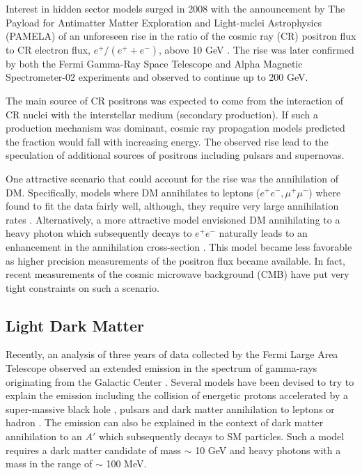 Interest in hidden sector models surged in 2008 with the announcement by 
The Payload for Antimatter Matter Exploration and Light-nuclei Astrophysics \\ 
(PAMELA) of an unforeseen rise in the ratio of the cosmic ray (CR) positron flux
to CR electron flux, $e^{+}/(e^{+} + e^{-})$, above 10 GeV \cite{pamela2008}.
The rise was later confirmed by both the 
Fermi Gamma-Ray Space Telescope \cite{ackermann2012} and Alpha Magnetic 
Spectrometer-02 \cite{aguilar2013} experiments and observed to continue
up to 200 GeV. 

The main source of CR positrons 
was expected to come from the interaction of CR nuclei with the interstellar 
medium (secondary production).  If such a production mechanism was dominant, 
cosmic ray propagation models predicted the fraction would fall with increasing
energy.  The observed rise lead to the speculation of additional sources of 
positrons including pulsars\cite{} and supernovas\cite{}.

One attractive scenario that could account for the rise was the annihilation of
DM.  Specifically, models where DM annihilates to leptons ($e^+e^-, \mu^+\mu^-$)
where found to fit the data fairly well, although, they
require very large annihilation rates \cite{cholis2009}. Alternatively, a 
more attractive model envisioned DM annihilating to a heavy photon which 
subsequently decays to 
$e^+e^-$ naturally leads to an enhancement in the annihilation cross-section
\cite{arkani-hamed2009}.  This model became less favorable as higher
precision measurements of the positron flux became available.  In fact, 
recent measurements of the cosmic microwave background (CMB) have put very 
tight constraints on such a scenario.

\subsection{Light Dark Matter}

Recently, an analysis of three years of data collected by the Fermi Large Area
Telescope observed an extended emission in the spectrum of gamma-rays 
originating from the Galactic Center \cite{}.  Several models have been 
devised to try to explain the emission including the collision of energetic 
protons accelerated by a super-massive black hole \cite{}, pulsars \cite{} and
dark matter annihilation to leptons or hadron \cite{}.  The emission can also
be explained in the context of dark matter annihilation to an $A'$ which 
subsequently decays to SM particles.  Such a model requires a dark matter 
candidate of mass $\sim$ 10 GeV and heavy photons with a mass in the range 
of $\sim$ 100 MeV. 

